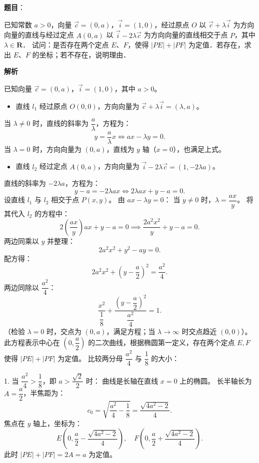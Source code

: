 \begin{answer}

\textbf{题目}：

已知常数 $a > 0$，向量 $\vec{c} = (0, a)$，$\vec{i} = (1, 0)$，经过原点 $O$ 以 $\vec{c} + \lambda\vec{i}$ 为方向向量的直线与经过定点 $A(0, a)$ 以 $\vec{i} - 2\lambda\vec{c}$ 为方向向量的直线相交于点 $P$，其中 $\lambda \in \mathbf{R}$．
试问：是否存在两个定点 $E$、$F$，使得 $|PE| + |PF|$ 为定值．若存在，求出 $E$、$F$ 的坐标；若不存在，说明理由．

\textbf{解析}

已知向量 $\vec{c} = (0, a)$，$\vec{i} = (1, 0)$，其中 $a > 0$。
\begin{itemize}
\item 直线 $l_1$ 经过原点 $O(0, 0)$，方向向量为 $\vec{c} + \lambda\vec{i} = (\lambda, a)$。
\end{itemize}
  当 $\lambda \ne 0$ 时，直线的斜率为 $\dfrac{a}{\lambda}$，方程为：
\nopagebreak[4]
\[y = \frac{a}{\lambda} x \iff ax - \lambda y = 0.\]
  当 $\lambda = 0$ 时，方向向量为 $(0, a)$，直线为 $y$ 轴（$x = 0$），也满足上式。
\begin{itemize}
\item 直线 $l_2$ 经过定点 $A(0, a)$，方向向量为 $\vec{i} - 2\lambda\vec{c} = (1, -2\lambda a)$。
\end{itemize}
  直线的斜率为 $-2\lambda a$，方程为：
\nopagebreak[4]
\[y - a = -2\lambda a x \iff 2\lambda a x + y - a = 0.\]
设直线 $l_1$ 与 $l_2$ 相交于点 $P(x, y)$。
由 $ax - \lambda y = 0$：
当 $y \ne 0$ 时，$\lambda = \dfrac{ax}{y}$。
将其代入 $l_2$ 的方程中：
\nopagebreak[4]
\[2\left(\frac{ax}{y}\right) a x + y - a = 0 \implies \frac{2a^2 x^2}{y} + y - a = 0.\]
两边同乘以 $y$ 并整理：
\nopagebreak[4]
\[2a^2 x^2 + y^2 - ay = 0.\]
配方得：
\nopagebreak[4]
\[2a^2 x^2 + \left(y - \frac{a}{2}\right)^2 = \frac{a^2}{4}.\]
两边同除以 $\dfrac{a^2}{4}$：
\nopagebreak[4]
\[\frac{x^2}{\dfrac{1}{8}} + \frac{\left(y - \dfrac{a}{2}\right)^2}{\dfrac{a^2}{4}} = 1.\]
（检验 $\lambda = 0$ 时，交点为 $(0, a)$，满足方程；当 $\lambda \to \infty$ 时交点趋近 $(0, 0)$）。
此方程表示中心在 $\left(0, \dfrac{a}{2}\right)$ 的二次曲线，根据椭圆第一定义，存在两个定点 $E, F$ 使得 $|PE| + |PF|$ 为定值。
比较两分母 $\dfrac{a^2}{4}$ 与 $\dfrac{1}{8}$ 的大小：

1. 当 $\dfrac{a^2}{4} > \dfrac{1}{8}$，即 $a > \dfrac{\sqrt{2}}{2}$ 时：
   曲线是长轴在直线 $x = 0$ 上的椭圆。
   长半轴长为 $A = \dfrac{a}{2}$，半焦距为：
\nopagebreak[4]
\[c_0 = \sqrt{\frac{a^2}{4} - \frac{1}{8}} = \frac{\sqrt{4a^2 - 2}}{4}.\]
   焦点在 $y$ 轴上，坐标为：
\nopagebreak[4]
\[E\left(0, \frac{a}{2} - \frac{\sqrt{4a^2 - 2}}{4}\right), \quad F\left(0, \frac{a}{2} + \frac{\sqrt{4a^2 - 2}}{4}\right).\]
   此时 $|PE| + |PF| = 2A = a$ 为定值。


\end{answer}
